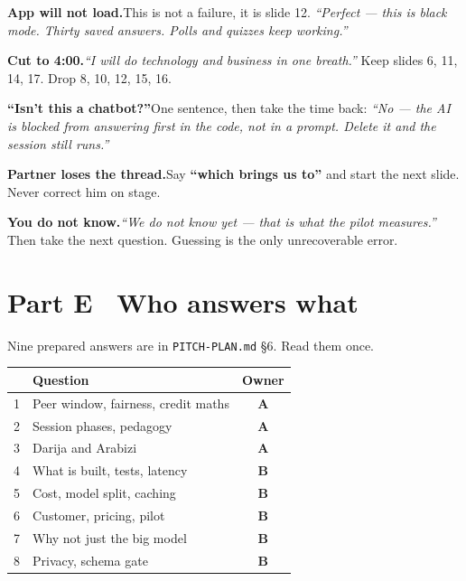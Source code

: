 \documentclass[11pt,a4paper]{article}
\begin{document}
\textbf{App will not load.}\quad This is not a failure, it is slide 12.
\emph{``Perfect --- this is black mode. Thirty saved answers. Polls and quizzes keep working.''}

\medskip
\textbf{Cut to 4:00.}\quad \emph{``I will do technology and business in one breath.''}
Keep slides 6, 11, 14, 17. Drop 8, 10, 12, 15, 16.

\medskip
\textbf{``Isn't this a chatbot?''}\quad One sentence, then take the time back:
\emph{``No --- the AI is blocked from answering first in the code, not in a prompt. Delete it and
the session still runs.''}

\medskip
\textbf{Partner loses the thread.}\quad Say \textbf{``which brings us to''} and start the next
slide. Never correct him on stage.

\medskip
\textbf{You do not know.}\quad \emph{``We do not know yet --- that is what the pilot measures.''}
Then take the next question. Guessing is the only unrecoverable error.

\section{Part E \textbullet\ Who answers what}

Nine prepared answers are in \texttt{PITCH-PLAN.md} \S6. Read them once.

\medskip
\noindent
\begin{tabularx}{\linewidth}{@{}lXc@{}}
\toprule
& \textbf{Question} & \textbf{Owner} \\
\midrule
1 & Peer window, fairness, credit maths & \textcolor{colA}{\textbf{A}} \\
2 & Session phases, pedagogy & \textcolor{colA}{\textbf{A}} \\
3 & Darija and Arabizi & \textcolor{colA}{\textbf{A}} \\
4 & What is built, tests, latency & \textcolor{colB}{\textbf{B}} \\
5 & Cost, model split, caching & \textcolor{colB}{\textbf{B}} \\
6 & Customer, pricing, pilot & \textcolor{colB}{\textbf{B}} \\
7 & Why not just the big model & \textcolor{colB}{\textbf{B}} \\
8 & Privacy, schema gate & \textcolor{colB}{\textbf{B}} \\
\bottomrule
\end{tabularx}

\end{document}
